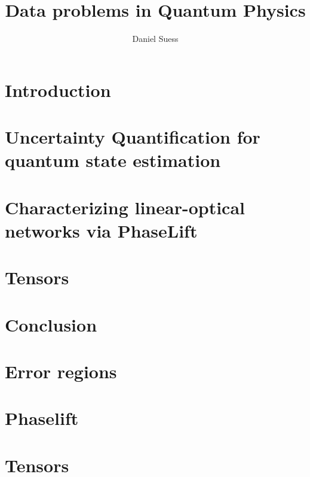 \documentclass[a4paper,11pt,BCOR=8mm,twoside,headsepline]{scrbook}
\author{Daniel Suess}
\title{Data problems in Quantum Physics}
\begin{document}
\frontmatter
\maketitle
\tableofcontents
\newpage
\makeatletter
\providecommand\@dotsep{5}
\makeatother
\listoftodos\relax
\newpage

\mainmatter

\chapter{Introduction}
\label{chap:introduction}


\chapter{Uncertainty Quantification for quantum state estimation}%
\label{chap:error}


\chapter{Characterizing linear-optical networks via PhaseLift}%
\label{chap:phaselift}


\chapter{Tensors}%
\label{chap:tensors}


\chapter{Conclusion}
\label{chap:conclusion}


\appendix

\chapter{Error regions}


\chapter{Phaselift}


\chapter{Tensors}


\printbibliography[heading=bibintoc]
\end{document}
